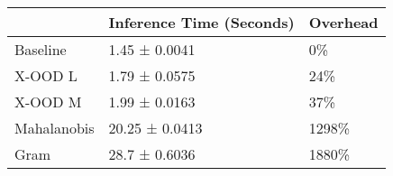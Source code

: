 \begin{tabular}{lll}
\toprule
{} & Inference Time (Seconds) & Overhead \\
\midrule
Baseline    &            1.45 ± 0.0041 &       0\% \\
X-OOD L     &            1.79 ± 0.0575 &      24\% \\
X-OOD M     &            1.99 ± 0.0163 &      37\% \\
Mahalanobis &           20.25 ± 0.0413 &    1298\% \\
Gram        &            28.7 ± 0.6036 &    1880\% \\
\bottomrule
\end{tabular}

